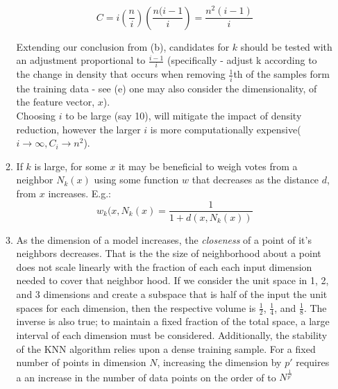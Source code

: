 \documentclass{report}
\begin{document}
\begin{enumerate}
\begin{enumerate}
			\begin{equation*}
			 C = i \left( \frac{n}{i} \right)\left( \frac{n(i-1}{i} \right) =  \frac{n^2(i-1)}{i}
			\end{equation*}
			
			Extending our conclusion from (b), candidates for $k$ should be tested with an adjustment proportional to $\frac{i-1}{i}$ (specifically - adjust k according to the change in density that occurs when removing $\frac{1}{i}$th of the samples form the training data - see (e) one may also consider the dimensionality, of the feature vector, $x$). \\
			
			Choosing $i$ to be large (say 10), will mitigate the impact of density reduction, however the larger $i$ is more computationally expensive($i \rightarrow \infty, C_i \rightarrow n^2$).
						
			\item If $k$ is large, for some $x$ it may be beneficial to weigh votes from a neighbor $N_k(x)$ using some function $w$ that decreases as the distance $d$, from $x$ increases. E.g.:
			\begin{equation*}
				w_{k}(x,N_k(x) = \frac{1}{1 + d(x,N_k(x) )}
			\end{equation*}
			
			\item As the dimension of a model increases, the \textit{closeness} of a point of it's neighbors decreases. That is the the size of neighborhood about a point does not scale linearly with the fraction of each each input dimension needed to cover that neighbor hood. If we consider the unit space in 1, 2, and 3 dimensions and create a subspace that is half of the input the unit spaces for each dimension, then the respective volume is $\frac{1}{2}$, $\frac{1}{4}$, and $\frac{1}{8}$. The inverse is also true; to maintain a fixed fraction of the total space, a large interval of each dimension must be considered. Additionally, the stability of the KNN algorithm relies upon a dense training sample. For a fixed number of points in dimension $N$, increasing the dimension by $p'$ requires a an increase in the number of data points on the order of to $N^\frac{1}{p'}$
		\end{enumerate}
		
	
\end{enumerate}
\end{document}
